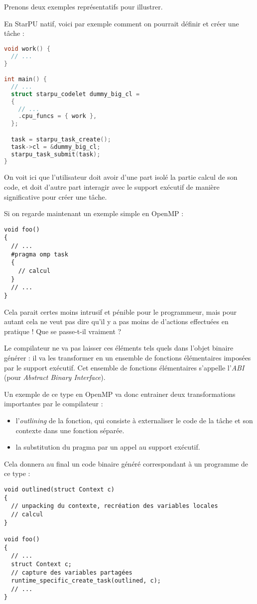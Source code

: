Prenons deux exemples représentatifs pour illustrer.

En StarPU natif, voici par exemple comment on pourrait définir et créer une tâche :

\begin{lstlisting}[language=c++,caption=Exemple simple en StarPU,label=lst:context:simple-starpu,basicstyle=\small]
void work() {
  // ...
}

int main() {
  // ...
  struct starpu_codelet dummy_big_cl =
  {
    // ...
    .cpu_funcs = { work },
  };

  task = starpu_task_create();
  task->cl = &dummy_big_cl;
  starpu_task_submit(task);
}
\end{lstlisting}

On voit ici que l'utilisateur doit avoir d'une part isolé la partie calcul de son code, et doit d'autre part interagir avec le support exécutif de manière significative pour créer une tâche.

Si on regarde maintenant un exemple simple en OpenMP :

\begin{lstlisting}
void foo()
{
  // ...
  #pragma omp task
  {
    // calcul
  }
  // ...
}
\end{lstlisting}

Cela parait certes moins intrusif et pénible pour le programmeur, mais pour autant cela ne veut pas dire qu'il y a pas moins de d'actions effectuées en pratique !
Que se passe-t-il vraiment ?

Le compilateur ne va pas laisser ces éléments tels quels dans l'objet binaire générer : il va les transformer en un ensemble de fonctions élémentaires imposées par le support exécutif. Cet ensemble de fonctions élémentaires s'appelle l'\emph{ABI} (pour \emph{Abstract Binary Interface}).

Un exemple de ce type en OpenMP va donc entrainer deux transformations importantes par le compilateur :
\begin{itemize}
  \item l'\emph{outlining} de la fonction, qui consiste à externaliser le code de la tâche et son contexte dans une fonction séparée.
  \item la substitution du pragma par un appel au support exécutif.
\end{itemize}

Cela donnera au final un code binaire généré correspondant à un programme de ce type :

\begin{lstlisting}
void outlined(struct Context c)
{
  // unpacking du contexte, recréation des variables locales
  // calcul
}

void foo()
{
  // ...
  struct Context c;
  // capture des variables partagées
  runtime_specific_create_task(outlined, c);
  // ...
}
\end{lstlisting}

